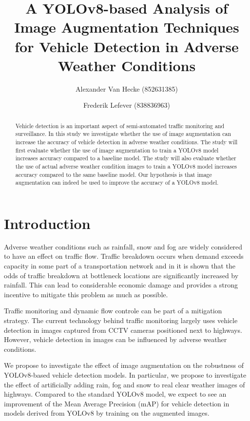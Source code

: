 \documentclass[]{article}
\title{
	A YOLOv8-based Analysis of Image Augmentation Techniques for Vehicle Detection in Adverse Weather Conditions}
\author{
		Alexander Van Hecke \small(852631385) \and 
		Frederik Lefever    \small(838836963)}
\begin{document}
\maketitle

\begin{abstract}
	Vehicle detection is an important aspect of semi-automated traffic monitoring and surveillance.  In this study we investigate whether the use of image augmentation can increase the accuracy of vehicle detection in adverse weather conditions.  The study will first evaluate whether the use of image augmentation to train a YOLO\small{v8} model increases accuracy compared to a baseline model.  The study will also evaluate whether the use of actual adverse weather condition images to train a YOLO\small{v8} model increases accuracy compared to the same baseline model.  Our hypothesis is that image augmentation can indeed be used to improve the accuracy of a YOLO\small{v8} model.
\end{abstract}

\section{Introduction}

	Adverse weather conditions such as rainfall, snow and fog are widely considered to have an effect on traffic flow. Traffic breakdown occurs when demand exceeds capacity in some part of a transportation network and in \cite{stralenInfluenceAdverseWeather2015} it is shown that the odds of traffic breakdown at bottleneck locations are significantly increased by rainfall.  This can lead to considerable economic damage and provides a strong incentive to mitigate this problem as much as possible.
	
	Traffic monitoring and dynamic flow controle can be part of a mitigation strategy. The current technology behind traffic monitoring largely uses vehicle detection in images captured from CCTV cameras positioned next to highways. However, vehicle detection in images can be influenced by adverse weather conditions.
	
	We propose to investigate the effect of image augmentation on the robustness of YOLO{\small v8}-based vehicle detection models. In particular, we propose to investigate the effect of artificially adding rain, fog and snow to real clear weather images of highways. Compared to the standard YOLO{\small v8} model, we expect to see an improvement of the Mean Average Precision (mAP) for vehicle detection in models derived from YOLO{\small v8} by training on the augmented images.
	
\end{document}
